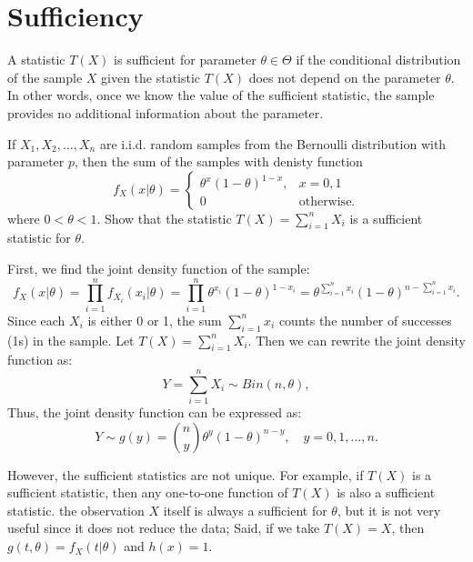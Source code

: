 \chapter{Sufficiency}

\begin{definition}[Sufficiency]
    A statistic $T(X)$ is sufficient for parameter $\theta \in \Theta$ if 
    the conditional distribution of the sample $X$ given the statistic $T(X)$ 
    does not depend on the parameter $\theta$.
    In other words, once we know the value of the sufficient statistic, 
    the sample provides no additional information about the parameter.
\end{definition}

\begin{example}
    If $X_1, X_2, \ldots, X_n$ are i.i.d. random samples from the Bernoulli distribution with parameter $p$, then the sum of the samples
    with denisty function
    \[
        f_X(x|\theta) = \begin{cases} 
            \theta^x (1-\theta)^{1-x}, & x = 0, 1\\
            0 & \text{otherwise}.
        \end{cases}
    \]
    where $0 < \theta < 1$. Show that the statistic $T(X) = \sum_{i=1}^n X_i$ is a sufficient statistic for $\theta$.
\end{example}
\begin{solution}
    First, we find the joint density function of the sample:
    \[
        f_X(x|\theta) = \prod_{i=1}^n f_{X_i}(x_i|\theta) = \prod_{i=1}^n \theta^{x_i} (1-\theta)^{1-x_i} = \theta^{\sum_{i=1}^n x_i} (1-\theta)^{n - \sum_{i=1}^n x_i}.
    \]
    Since each $X_i$ is either 0 or 1, the sum $\sum_{i=1}^n x_i$ counts the number of successes (1s) in the sample. Let $T(X) = \sum_{i=1}^n X_i$. Then we can rewrite the joint density function as:
    \[
        Y = \sum_{i=1}^n X_i \sim Bin(n, \theta),
    \]
    Thus, the joint density function can be expressed as:
    \[
        Y \sim g(y) = {n \choose y} \theta^y (1-\theta)^{n-y}, \quad y = 0, 1, \ldots, n.
    \]

\end{solution}

However, the sufficient statistics are not unique. For example, if $T(X)$ is a sufficient statistic, then any one-to-one function of $T(X)$ is also a sufficient statistic.
the observation $X$ itself is always a sufficient for $\theta$, but it is not very useful since it does not reduce the data; 
Said, if we take $T(X) = X$, then $g(t, \theta) = f_X(t|\theta)$ and $h(x) = 1$.

